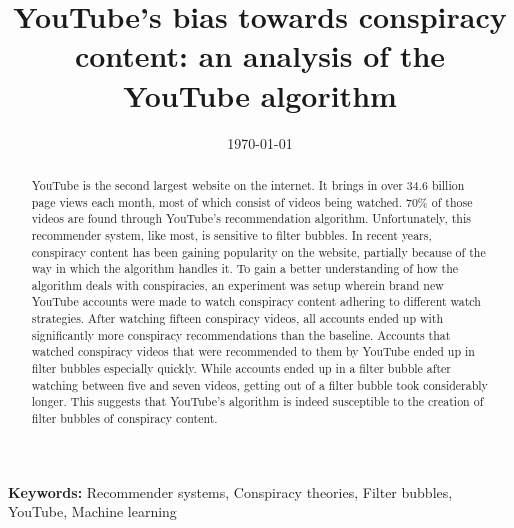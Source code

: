 \documentclass{uva-inf-article}
\title{YouTube's bias towards conspiracy content: an analysis of the YouTube algorithm}
\date{\today}
\begin{document}
\maketitle

\begin{abstract}
    YouTube is the second largest website on the internet. It brings in over 34.6 billion page views each month,
    most of which consist of videos being watched. 70\% of those videos are found through YouTube's 
    recommendation algorithm. Unfortunately, this recommender system, like most, is sensitive to filter bubbles.
    In recent years, conspiracy content has been gaining popularity on the website, partially because of the way
    in which the algorithm handles it. To gain a better understanding of how the algorithm deals with
    conspiracies, an experiment was setup wherein brand new YouTube accounts were made to watch conspiracy
    content adhering to different watch strategies. After watching fifteen conspiracy videos, all accounts ended
    up with significantly more conspiracy recommendations than the baseline. Accounts that watched conspiracy 
    videos that were recommended to them by YouTube ended up in filter bubbles especially quickly. While
    accounts ended up in a filter bubble after watching between five and seven videos, getting out of a filter
    bubble took considerably longer. This suggests that YouTube's algorithm is indeed susceptible to the
    creation of filter bubbles of conspiracy content. 
\end{abstract}

{\bf Keywords:} Recommender systems, Conspiracy theories, Filter bubbles, YouTube, Machine learning

\linenumbers















\newpage



\newpage
\nolinenumbers

 

\newpage


\end{document}
